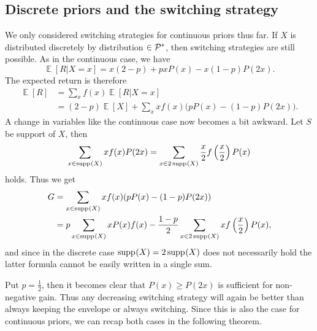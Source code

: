 \documentclass[a4paper]{report}
\theoremstyle{plain}
\theoremstyle{definition}
\theoremstyle{remark}
\numberwithin{equation}{chapter}
\let\P\relax
\DeclareMathOperator{\P}{\mathbb{P}}
\DeclareMathOperator{\E}{\mathbb{E}}
\DeclareMathOperator{\1}{\mathbbm{1}}
\DeclareMathOperator{\supp}{supp}
\newcommand{\Pmod}{\mathcal{P}^*}
\begin{document}
\subsection{Discrete priors and the switching strategy}
We only considered switching strategies for continuous priors thus far. If $X$ is distributed discretely by distribution $\P\in\Pmod$, then switching strategies are still possible. As in the continuous case, we have
\begin{equation}
\E[R|X=x]=x(2-p)+pxP(x)-x(1-p)P(2x).
\end{equation}
The expected return is therefore
\begin{align}
\E[R]&=\sum_x f(x)\E[R|X=x]\\
&=(2-p)\E[X]+\sum_x xf(x)\big(pP(x)-(1-p)P(2x)\big).
\end{align}
A change in variables like the continuous case now becomes a bit awkward. Let $S$ be support of $X$, then
\begin{equation}
\sum_{x\in \supp_{\P}(X)}xf(x)P(2x)=\sum_{x\in2\supp_{\P}(X)}\frac{x}{2}f\left(\frac{x}{2}\right)P(x)
\end{equation}
holds. Thus we get
\begin{align}
G&=\sum_{x\in \supp_{\P}(X)}xf(x)(pP(x)-(1-p)P(2x))\\
&=p\sum_{x\in \supp_{\P}(X)}xP(x)f(x)-\frac{1-p}{2}\sum_{x\in2\supp_{\P}(X)}xf\left(\frac{x}{2}\right)P(x),
\end{align}
and since in the discrete case $\supp_{\P}(X)=2\supp_{\P}(X)$ does not necessarily hold the latter formula cannot be easily written in a single sum.

Put $p=\frac{1}{2}$, then it becomes clear that $P(x)\geq P(2x)$ is sufficient for non-negative gain. Thus any decreasing switching strategy will again be better than always keeping the envelope or always switching. Since this is also the case for continuous priors, we can recap both cases in the following theorem.
\end{document}
